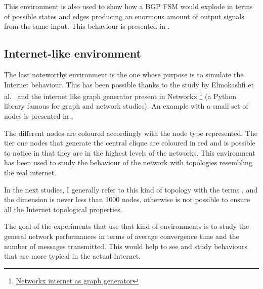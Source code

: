 This environment is also used to show how a \ac{BGP} \ac{FSM} would explode
in terms of possible states and edges producing an enormous amount of
output signals from the same input.
This behaviour is presented in .

\subsection{Internet-like environment}
\label{subsec:internet_like_env}

The last noteworthy environment is the one whose purpose is to simulate the Internet
behaviour.
This has been possible thanks to the study by Elmokashfi et al.~\cite{elmokashfi2010scalability}
and the internet like graph generator present in Networkx \footnote{\href{https://networkx.org/documentation/stable/reference/generated/networkx.generators.internet_as_graphs.random_internet_as_graph.html\#networkx.generators.internet_as_graphs.random_internet_as_graph}{Networkx internet as graph generator}}
(a Python library famous for graph and network studies).
An example with a small set of nodes is presented in .

The different nodes are coloured accordingly with the node type represented.
The tier one nodes that generate the central clique are coloured in red and
is possible to notice in  that they are
in the highest levels of the networks.
This environment has been used to study the behaviour of the network with
topologies resembling the real internet.

In the next studies, I generally refer to this kind of topology with the
terms , and the dimension is never less than \num{1000} nodes,
otherwise is not possible to ensure all the Internet topological properties.

The goal of the experiments that use that kind of environments is to study
the general network performances in terms of average convergence time and
the number of messages transmitted.
This would help to see and study behaviours that are more typical in the actual
Internet.
